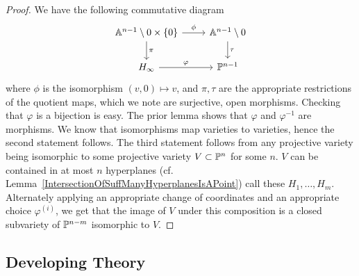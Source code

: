     \begin{proof}
        We have the following commutative diagram 
        $$
            \begin{tikzcd}
                \A^{n-1}\setminus 0 \times \{0\} \arrow[r, "\phi"] \arrow[d, "\pi"] & \A^{n-1}\setminus 0\arrow[d, "\tau"] \\
                H_\infty \arrow[r,"\varphi"] & \Pp^{n-1}
            \end{tikzcd}
        $$
        where $\phi$ is the isomorphism $(v,0)\mapsto v$, and $\pi,\tau$ are the appropriate restrictions of the quotient maps, which we note are surjective, open morphisms. Checking that $\varphi$ is a bijection is easy. The prior lemma shows that $\varphi$ and $\varphi^{-1}$ are morphisms. We know that isomorphisms map varieties to varieties, hence the second statement follows. The third statement follows from any projective variety being isomorphic to some projective variety $V\subset\mathbb{P}^n$ for some $n$. $V$ can be contained in at most $n$ hyperplanes (cf. Lemma~\ref{IntersectionOfSuffManyHyperplanesIsAPoint}) call these $H_1,\dots,H_m$. Alternately applying an appropriate change of coordinates and an appropriate choice $\varphi^{(i)}$, we get that the image of $V$ under this composition is a closed subvariety of $\mathbb{P}^{n-m}$ isomorphic to $V$.
    \end{proof}
    \subsection{Developing Theory}
